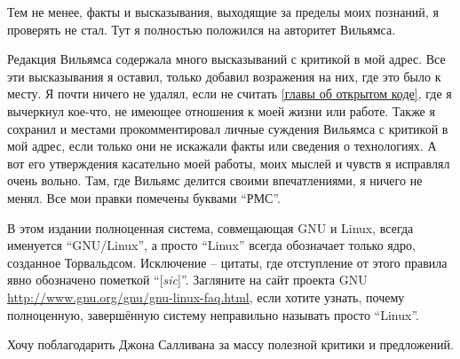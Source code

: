 Тем не менее, факты и высказывания, выходящие за пределы моих познаний, я проверять не стал. Тут я полностью положился на авторитет Вильямса.

Редакция Вильямса содержала много высказываний с критикой в мой адрес. Все эти высказывания я оставил, только добавил возражения на них, где это было к месту. Я почти ничего не удалял, если не считать \autoref{главы об открытом коде}, где я вычеркнул кое-что, не имеющее отношения к моей жизни или работе. Также я сохранил и местами прокомментировал личные суждения Вильямса с критикой в мой адрес, если только они не искажали факты или сведения о технологиях. А вот его утверждения касательно моей работы, моих мыслей и чувств я исправлял очень вольно. Там, где Вильямс делится своими впечатлениями, я ничего не менял. Все мои правки помечены буквами \enquote{РМС}.

В этом издании полноценная система, совмещающая GNU и Linux, всегда именуется \enquote{GNU/Linux}, а просто \enquote{Linux} всегда обозначает только ядро, созданное Торвальдсом. Исключение -- цитаты, где отступление от этого правила явно обозначено пометкой \enquote{[\textit{sic}]}. Загляните на сайт проекта GNU \url{http://www.gnu.org/gnu/gnu-linux-faq.html}, если хотите узнать, почему полноценную, завершённую систему неправильно называть просто \enquote{Linux}.

Хочу поблагодарить Джона Салливана за массу полезной критики и предложений.
